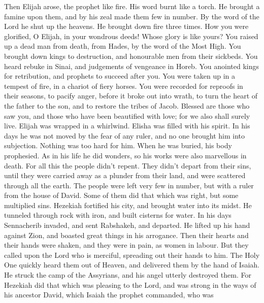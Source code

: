 Then Elijah arose, the prophet like fire. His word burnt
like a torch.  He brought a famine upon them, and by his
zeal made them few in number.  By the word of the Lord he
shut up the heavens. He brought down fire three times.  How
you were glorified, O Elijah, in your wondrous deeds! Whose glory is
like yours?  You raised up a dead man from death, from
Hades, by the word of the Most High.  You brought down kings
to destruction, and honourable men from their sickbeds.  You
heard rebuke in Sinai, and judgements of vengeance in Horeb.
 You anointed kings for retribution, and prophets to succeed
after you.  You were taken up in a tempest of fire, in a
chariot of fiery horses.  You were recorded for reproofs in
their seasons, to pacify anger, before it broke out into wrath, to turn
the heart of the father to the son, and to restore the tribes of Jacob.
 Blessed are those who saw you, and those who have been
beautified with love; for we also shall surely live. 
Elijah was wrapped in a whirlwind. Elisha was filled with his spirit. In
his days he was not moved by the fear of any ruler, and no one brought
him into subjection.  Nothing was too hard for him. When he
was buried, his body prophesied.  As in his life he did
wonders, so his works were also marvellous in death.  For
all this the people didn't repent. They didn't depart from their sins,
until they were carried away as a plunder from their land, and were
scattered through all the earth. The people were left very few in
number, but with a ruler from the house of David.  Some of
them did that which was right, but some multiplied sins. 
Hezekiah fortified his city, and brought water into its midst. He
tunneled through rock with iron, and built cisterns for water.
 In his days Sennacherib invaded, and sent Rabshakeh, and
departed. He lifted up his hand against Zion, and boasted great things
in his arrogance.  Then their hearts and their hands were
shaken, and they were in pain, as women in labour.  But
they called upon the Lord who is merciful, spreading out their hands to
him. The Holy One quickly heard them out of Heaven, and delivered them
by the hand of Isaiah.  He struck the camp of the
Assyrians, and his angel utterly destroyed them.  For
Hezekiah did that which was pleasing to the Lord, and was strong in the
ways of his ancestor David, which Isaiah the prophet commanded, who was
